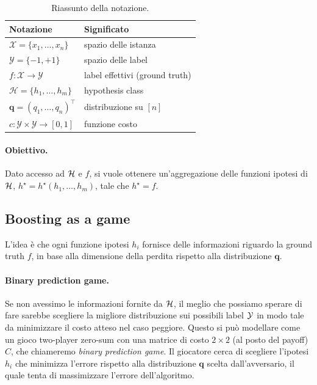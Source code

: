 \begin{table}[h]
    \centering
    \begin{tabular}{ll}
        \toprule
        Notazione & Significato \\
        \midrule
        $\mathcal{X} = \{x_1, \ldots, x_n\}$ & spazio delle istanza \\
        $\mathcal{Y} = \{-1, +1\}$ & spazio delle label \\
        $f: \mathcal{X} \rightarrow \mathcal{Y}$ & label effettivi (ground truth)\\
        $\mathcal{H} = \{h_1, \ldots, h_m\}$ & hypothesis class \\
        $\mathbf{q} = (q_1, \ldots, q_n)^\top$ & distribuzione su $[n]$ \\
        $c: \mathcal{Y} \times \mathcal{Y} \rightarrow [0, 1]$ & funzione costo \\
        \bottomrule
    \end{tabular}
    \caption{Riassunto della notazione.}
\end{table}

\paragraph{Obiettivo.} Dato accesso ad $\mathcal{H}$ e $f$, si vuole ottenere un'aggregazione delle funzioni ipotesi di $\mathcal{H}$, $h^\star = h^\star \left(h_1, \dots, h_m\right)$, tale che $h^\star = f$.

\subsection*{Boosting as a game}

L'idea è che ogni funzione ipotesi $h_i$ fornisce delle informazioni riguardo la ground truth $f$, in base alla dimensione della perdita rispetto alla distribuzione $\bm q$.

\paragraph{Binary prediction game.} Se non avessimo le informazioni fornite da $\mathcal{H}$, il meglio che possiamo sperare di fare sarebbe scegliere la migliore distribuzione sui possibili label $\mathcal{Y}$ in modo tale da minimizzare il costo atteso nel caso peggiore. Questo si può modellare come un gioco two-player zero-sum con una matrice di costo $2 \times 2$ (al posto del payoff) $C$, che chiameremo \textit{binary prediction game}. Il giocatore cerca di scegliere l'ipotesi $h_i$ che minimizza l'errore rispetto alla distribuzione $\bm q$ scelta dall'avversario, il quale tenta di massimizzare l'errore dell'algoritmo.

